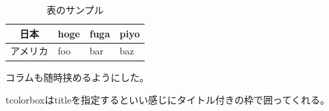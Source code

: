 \documentclass[11pt,dvipdfmx,b5paper,oneside]{jsbook}
\begin{document}
\begin{table}[H]
  \centering
  \caption{表のサンプル}
  \begin{tabular}{|c|l|l|l|} \hline
    日本 & hoge & fuga & piyo \\ \hline
    アメリカ & foo & bar & baz \\ \hline
  \end{tabular}
  \label{table-sample}
\end{table}


\begin{tcolorbox}[title=これはコラム]
  コラムも随時挟めるようにした。

  tcolorboxはtitleを指定するといい感じにタイトル付きの枠で囲ってくれる。
\end{tcolorbox}
\end{document}
